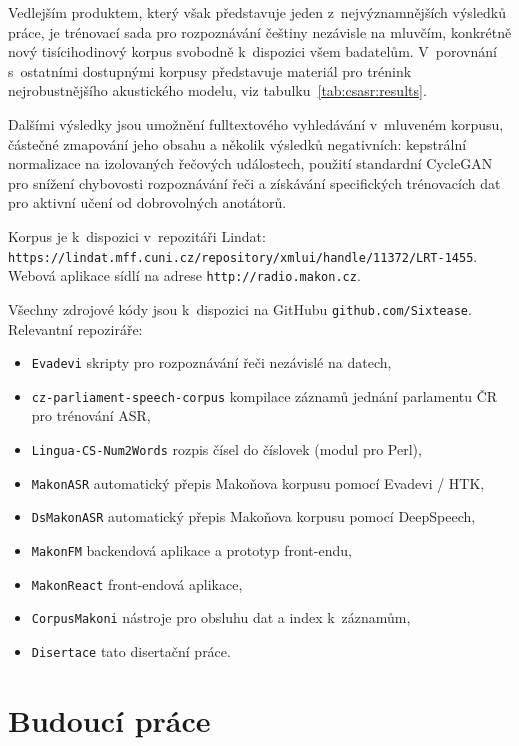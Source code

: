 Vedlejším produktem, který však představuje jeden z~nejvýznamnějších výsledků
práce, je trénovací sada pro rozpoznávání češtiny nezávisle na mluvčím,
konkrétně nový tisícihodinový korpus svobodně k~dispozici všem badatelům.
V~porovnání s~ostatními dostupnými korpusy představuje materiál pro trénink
nejrobustnějšího akustického modelu, viz tabulku~\ref{tab:csasr:results}.

Dalšími výsledky jsou umožnění fulltextového vyhledávání v~mluveném korpusu,
částečné zmapování jeho obsahu a několik výsledků negativních: kepstrální
normalizace na izolovaných řečových událostech, použití standardní CycleGAN pro
snížení chybovosti rozpoznávání řeči a získávání specifických trénovacích dat
pro aktivní učení od dobrovolných anotátorů.

Korpus je k~dispozici v~repozitáři Lindat:\\
\texttt{https://lindat.mff.cuni.cz/repository/xmlui/handle/11372/LRT-1455}.\\
Webová aplikace sídlí na adrese \texttt{http://radio.makon.cz}.

Všechny zdrojové kódy jsou k~dispozici na GitHubu \texttt{github.com/Sixtease}.
Relevantní repoziráře:
\begin{itemize}
\item{\texttt{Evadevi} skripty pro rozpoznávání řeči nezávislé na datech,}
\item{\texttt{cz-parliament-speech-corpus}
    kompilace záznamů jednání parlamentu ČR pro trénování ASR,
}
\item{\texttt{Lingua-CS-Num2Words} rozpis čísel do číslovek (modul pro Perl),}
\item{\texttt{MakonASR} automatický přepis Makoňova korpusu pomocí Evadevi / HTK,}
\item{\texttt{DsMakonASR} automatický přepis Makoňova korpusu pomocí DeepSpeech,}
\item{\texttt{MakonFM} backendová aplikace a prototyp front-endu,}
\item{\texttt{MakonReact} front-endová aplikace,}
\item{\texttt{CorpusMakoni} nástroje pro obsluhu dat a index k~záznamům,}
\item{\texttt{Disertace} tato disertační práce.}
\end{itemize}

\section{Budoucí práce}

